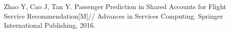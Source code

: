 
\begin{publications}{99}
    \item Zhao Y, Cao J, Tan Y. Passenger Prediction in Shared Accounts for Flight Service Recommendation[M]// Advances in Services Computing. Springer International Publishing, 2016.
\end{publications}
